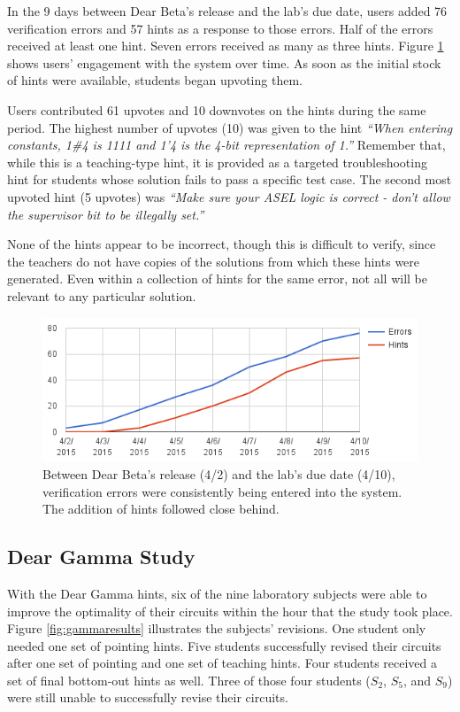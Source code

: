 In the 9 days between Dear Beta's release and the lab's due date, users added 76 verification errors and 57 hints as a response to those errors. Half of the errors received at least one hint. Seven errors received as many as three hints. Figure \ref{fig:betaengagement} shows users' engagement with the system over time. As soon as the initial stock of hints were available, students began upvoting them.

Users contributed 61 upvotes and 10 downvotes on the hints during the same period. The highest number of upvotes (10) was given to the hint {\it ``When entering constants, 1\#4 is 1111 and 1'4 is the 4-bit representation of 1.''} Remember that, while this is a teaching-type hint, it is provided as a targeted troubleshooting hint for students whose solution fails to pass a specific test case. The second most upvoted hint (5 upvotes) was {\it ``Make sure your ASEL logic is correct - don't allow the supervisor bit to be illegally set.''} 

None of the hints appear to be incorrect, though this is difficult to verify, since the teachers do not have copies of the solutions from which these hints were generated. Even within a collection of hints for the same error, not all will be relevant to any particular solution.


\begin{figure}
\centering
\includegraphics[width=1.0\columnwidth]{Body/figures/classoverflow/cumulativeErrorsAndHints.png}
\caption{Between Dear Beta's release (4/2) and the lab's due date (4/10), verification errors were consistently being entered into the system. The addition of hints followed close behind.}
\label{fig:betaengagement}
\end{figure}


\subsection{Dear Gamma Study}

With the Dear Gamma hints, six of the nine laboratory subjects were able to improve the optimality of their circuits within the hour that the study took place. Figure \ref{fig:gammaresults} illustrates the subjects' revisions. One student only needed one set of pointing hints. Five students successfully revised their circuits after one set of pointing and one set of teaching hints. Four students received a set of final bottom-out hints as well. Three of those four students ($S_2$, $S_5$, and $S_9$) were still unable to successfully revise their circuits. 

